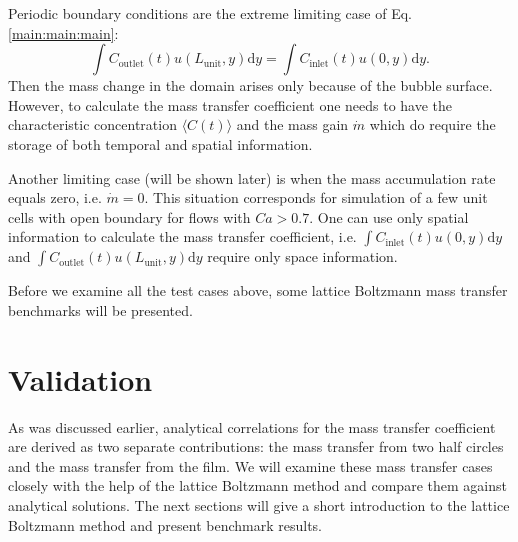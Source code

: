 \documentclass{article}
\newcommand{\beqstar}{\begin{equation*}}
\newcommand{\feqstar}{\end{equation*}}
\newcommand{\lunit}{L_{\mathrm{unit}}}
\newcommand{\cinlet}{C_{\mathrm{inlet}}}
\newcommand{\coutlet}{C_{\mathrm{outlet}}}
\begin{document}
Periodic boundary conditions are the extreme
limiting case of Eq. \ref{main:main:main}: 
\beqstar
\int{\coutlet(t)
u(\lunit,y)\mathrm{d}y}=\int{\cinlet(t) u(0,y)\mathrm{d}y}. 
\feqstar
Then the mass change in the domain arises only because of the bubble
surface. However, to calculate the mass transfer coefficient one needs to have
the characteristic concentration  $\langle C(t) \rangle$ and the mass gain $\dot{m}$
which do require the storage of both temporal and spatial information.

Another limiting case (will be shown later) is when the mass accumulation rate equals zero, i.e. $\dot{m}=0$. 
This situation corresponds for simulation of a few unit cells with open boundary for flows with
$Ca>0.7$.   One
can use only spatial information to calculate the mass transfer coefficient,
i.e. $\int{\cinlet(t) u(0,y) \mathrm{d}y}$ and $\int{\coutlet(t)
u(\lunit,y)\mathrm{d}y}$ require only space information. 

Before we examine all the test cases above, some lattice Boltzmann mass transfer
benchmarks will be presented. 

\section{Validation}
As was discussed earlier, analytical correlations for the mass transfer coefficient
are derived  as two separate contributions: the mass transfer from two
half circles and the mass transfer from the film. We will examine these
mass transfer cases closely with the help of the lattice Boltzmann method and compare them
against analytical
solutions. The next sections will give a short introduction to the lattice Boltzmann method and present benchmark results.
\end{document}

